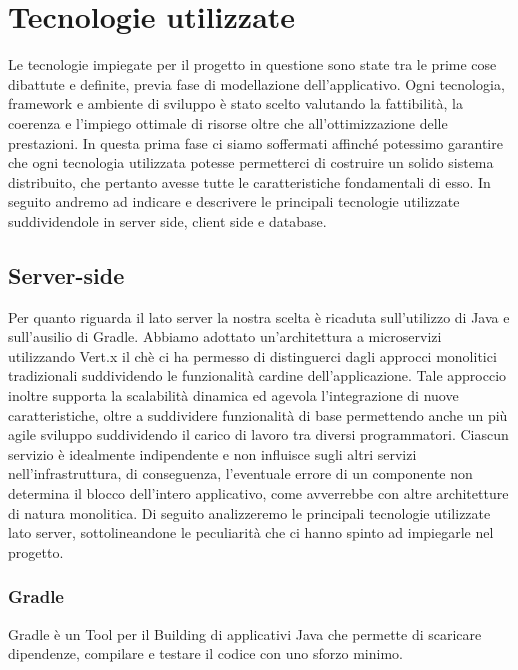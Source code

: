\section{Tecnologie utilizzate}
Le tecnologie impiegate per il progetto in questione sono state tra le prime cose dibattute e definite, previa fase di modellazione dell'applicativo. Ogni tecnologia, framework e ambiente di sviluppo è stato scelto valutando la fattibilità, la coerenza e l'impiego ottimale di risorse oltre che all'ottimizzazione delle prestazioni. In questa prima fase ci siamo soffermati affinché potessimo garantire che ogni tecnologia utilizzata potesse permetterci di costruire un solido sistema distribuito, che pertanto avesse tutte le caratteristiche fondamentali di esso. In seguito andremo ad indicare e descrivere le principali tecnologie utilizzate suddividendole in server side, client side e database.

\subsection{Server-side}
Per quanto riguarda il lato server la nostra scelta è ricaduta sull'utilizzo di Java e sull'ausilio di Gradle. Abbiamo adottato un'architettura a microservizi utilizzando Vert.x il chè ci ha permesso di distinguerci dagli approcci monolitici tradizionali suddividendo le funzionalità cardine dell'applicazione. Tale approccio inoltre supporta la scalabilità dinamica ed agevola l'integrazione di nuove caratteristiche, oltre a suddividere funzionalità di base permettendo anche un più agile sviluppo suddividendo il carico di lavoro tra diversi programmatori. Ciascun servizio è idealmente indipendente e non influisce sugli altri servizi nell'infrastruttura, di conseguenza, l'eventuale errore di un componente non determina il blocco dell'intero applicativo, come avverrebbe con altre architetture di natura monolitica. Di seguito analizzeremo le principali tecnologie utilizzate lato server, sottolineandone le peculiarità che ci hanno spinto ad impiegarle nel progetto.
\label{sub:server-tech}

\subsubsection{Gradle}

Gradle è un Tool per il Building di
applicativi Java che permette di scaricare dipendenze, compilare e testare il codice con uno sforzo minimo.\newline

